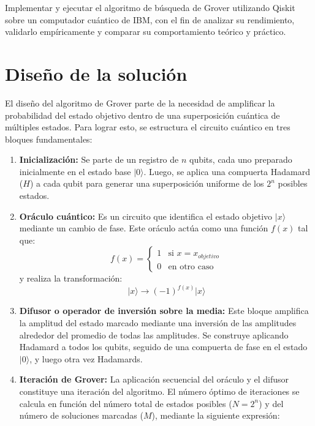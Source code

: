 \documentclass{article}
\begin{document}
Implementar y ejecutar el algoritmo de búsqueda de Grover utilizando Qiskit sobre un computador cuántico de IBM, con el fin de analizar su rendimiento, validarlo empíricamente y comparar su comportamiento teórico y práctico.

\section{Diseño de la solución}\label{sec:dis}

El diseño del algoritmo de Grover parte de la necesidad de amplificar la probabilidad del estado objetivo dentro de una superposición cuántica de múltiples estados. Para lograr esto, se estructura el circuito cuántico en tres bloques fundamentales:

\begin{enumerate}
    \item \textbf{Inicialización:} Se parte de un registro de $n$ qubits, cada uno preparado inicialmente en el estado base $\vert 0 \rangle$. Luego, se aplica una compuerta Hadamard ($H$) a cada qubit para generar una superposición uniforme de los $2^n$ posibles estados.

    \item \textbf{Oráculo cuántico:} Es un circuito que identifica el estado objetivo $\vert x \rangle$ mediante un cambio de fase. Este oráculo actúa como una función $f(x)$ tal que:
    \[
    f(x) = \begin{cases}
    1 & \text{si } x = x_{objetivo} \\
    0 & \text{en otro caso}
    \end{cases}
    \]
    y realiza la transformación:
    \[
    \vert x \rangle \rightarrow (-1)^{f(x)} \vert x \rangle
    \]

    \item \textbf{Difusor o operador de inversión sobre la media:} Este bloque amplifica la amplitud del estado marcado mediante una inversión de las amplitudes alrededor del promedio de todas las amplitudes. Se construye aplicando Hadamard a todos los qubits, seguido de una compuerta de fase en el estado $\vert 0 \rangle$, y luego otra vez Hadamards.

    \item \textbf{Iteración de Grover:} La aplicación secuencial del oráculo y el difusor constituye una iteración del algoritmo. 
    El número óptimo de iteraciones se calcula en función del número total de estados posibles ($N = 2^n$) y del número de soluciones marcadas ($M$), mediante la siguiente expresión:


\end{enumerate}
\end{document}
